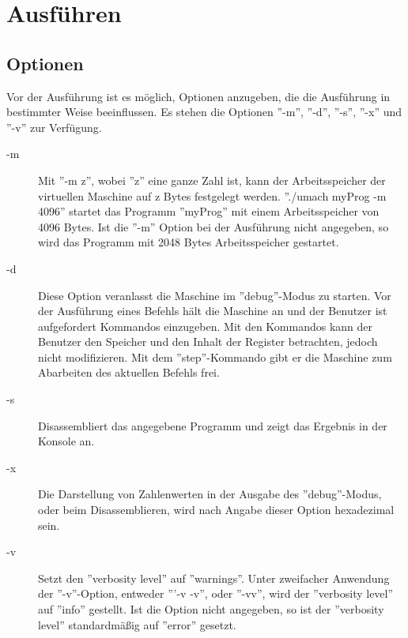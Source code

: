 \section{Ausführen}

\subsection{Optionen}
Vor der Ausführung ist es möglich, Optionen anzugeben, die die Ausführung in bestimmter Weise beeinflussen. Es stehen die Optionen ''-m'', ''-d'', ''-s'', ''-x'' und ''-v'' zur Verfügung.
\begin{description}
\item[-m]
Mit ''-m z'', wobei ''z'' eine ganze Zahl ist, kann der Arbeitsspeicher der virtuellen Maschine auf z Bytes festgelegt werden. ''./umach myProg -m 4096'' startet das Programm ''myProg'' mit einem Arbeitsspeicher von 4096 Bytes. Ist die ''-m'' Option bei der Ausführung nicht angegeben, so wird das Programm mit 2048 Bytes Arbeitsspeicher gestartet.
\item[-d]
Diese Option veranlasst die Maschine im ''debug''-Modus zu starten. Vor der Ausführung eines Befehls hält die Maschine an und der Benutzer ist aufgefordert Kommandos einzugeben. Mit den Kommandos kann der Benutzer den Speicher und den Inhalt der Register betrachten, jedoch nicht modifizieren. Mit dem ''step''-Kommando gibt er die Maschine zum Abarbeiten des aktuellen Befehls frei.
\item[-s]
Disassembliert das angegebene Programm und zeigt das Ergebnis in der Konsole an.
\item[-x]
Die Darstellung von Zahlenwerten in der Ausgabe des ''debug''-Modus, oder beim Disassemblieren, wird nach Angabe dieser Option hexadezimal sein.
\item[-v]
Setzt den ''verbosity level'' auf ''warnings''. Unter zweifacher Anwendung der ''-v''-Option, entweder '''-v -v'', oder ''-vv'', wird der ''verbosity level'' auf ''info'' gestellt. Ist die Option nicht angegeben, so ist der ''verbosity level'' standardmäßig auf ''error'' gesetzt.



\end{description}

